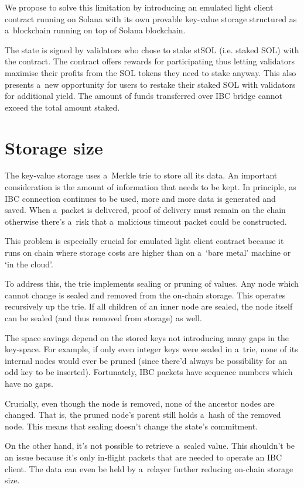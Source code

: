 \documentclass[sigplan,screen,authorversion]{acmart}
\begin{document}
We propose to solve this limitation by introducing an emulated light
client contract running on Solana with its own provable key-value
storage structured as a~blockchain running on top of Solana
blockchain.

The state is signed by validators who chose to stake stSOL
(i.e. staked SOL) with the contract.  The contract offers rewards for
participating thus letting validators maximise their profits from the
SOL tokens they need to stake anyway.  This also presents a~new
opportunity for users to restake their staked SOL with validators for
additional yield.  The amount of funds transferred over IBC bridge
cannot exceed the total amount staked.

\section{Storage size}

The key-value storage uses a~Merkle trie to store all its data.  An
important consideration is the amount of information that needs to be
kept.  In principle, as IBC connection continues to be used, more and
more data is generated and saved.  When a~packet is delivered, proof
of delivery must remain on the chain otherwise there’s a~risk that
a~malicious timeout packet could be constructed.

This problem is especially crucial for emulated light client contract
because it runs on chain where storage costs are higher than on
a~‘bare metal’ machine or ‘in the cloud’.

To address this, the trie implements sealing or pruning of values.
Any node which cannot change is sealed and removed from the on-chain
storage.  This operates recursively up the trie.  If all children of
an inner node are sealed, the node itself can be sealed (and thus
removed from storage) as well.

The space savings depend on the stored keys not introducing many gaps
in the key-space.  For example, if only even integer keys were sealed
in a~trie, none of its internal nodes would ever be pruned (since
there’d always be possibility for an odd key to be inserted).
Fortunately, IBC packets have sequence numbers which have no gaps.

Crucially, even though the node is removed, none of the ancestor nodes
are changed.  That is, the pruned node’s parent still holds a~hash of
the removed node.  This means that sealing doesn’t change the state’s
commitment.

On the other hand, it’s not possible to retrieve a~sealed value.  This
shouldn’t be an issue because it’s only in-flight packets that are
needed to operate an IBC client.  The data can even be held by
a~relayer further reducing on-chain storage size.
\end{document}
